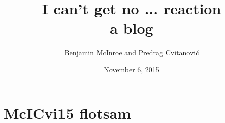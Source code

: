\documentclass[10pt,openany]{book}
\begin{document}
        \date{November 6, 2015} \Private{\date{\today}}

\title{ 			I can't get no ... reaction
       \\ \Huge 	a blog
        \\\vspace{1.0cm}
        }\author{
		Benjamin McInroe
         and
        Predrag Cvitanovi\'{c}
        }

%
\maketitle

\thispagestyle{empty}
\tableofcontents

\chapter{McICvi15 flotsam}
\label{s:flotsam}


\newpage



\end{document}
